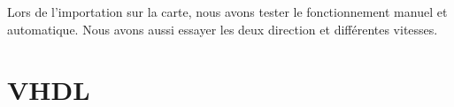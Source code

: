 \documentclass[10pt,a4paper]{article}
\begin{document}
Lors de l'importation sur la carte, nous avons tester le fonctionnement manuel et automatique. Nous avons aussi essayer les deux direction et différentes vitesses.

\newpage
\section{VHDL}




\end{document}
